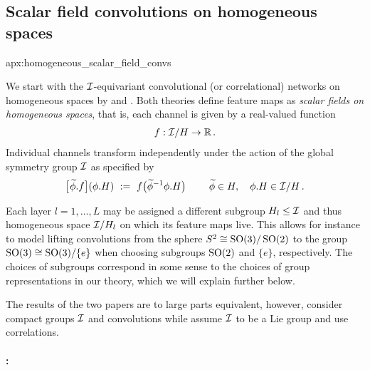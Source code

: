 \toclesslab\subsection{Scalar field convolutions on homogeneous spaces}{apx:homogeneous_scalar_field_convs}

We start with the $\mathcal{I}$-equivariant convolutional (or correlational) networks on homogeneous spaces by \citet{Kondor2018-GENERAL} and \citet{bekkers2020bspline}.
Both theories define feature maps as \emph{scalar fields on homogeneous spaces}, that is, each channel is given by a real-valued function
\begin{align}\label{eq:scalar_field_homogeneous_space}
    f: \mathcal{I}/H \to \mathbb{R} \,.
\end{align}
Individual channels transform independently under the action of the global symmetry group $\mathcal{I}$ as specified by
\begin{align}\label{eq:group_action_homogeneous_space_scalar_field}
    \big[\mkern1mu \widetilde{\phi}.f\big] (\phi.H)\ :=\ f\big( \widetilde{\phi}^{-1} \phi.H \big)
    \qquad\ \widetilde{\phi}\in H,\ \ \ \phi.H\in \mathcal{I}/H \,.
\end{align}

Each layer $l = 1,\dots, L$ may be assigned a different subgroup $H_l \leq\mathcal{I}$ and thus homogeneous space $\mathcal{I}/H_l$ on which its feature maps live.
This allows for instance to model lifting convolutions from the sphere $S^2 \cong \operatorname{SO}(3)/\operatorname{SO}(2)$ to the group $\operatorname{SO}(3) \cong \operatorname{SO}(3)/\{e\}$ when choosing subgroups $\operatorname{SO}(2)$ and $\{e\}$, respectively.
The choices of subgroups correspond in some sense to the choices of group representations in our theory, which we will explain further below.

The results of the two papers are to large parts equivalent, however,
\citet{Kondor2018-GENERAL} consider compact groups $\mathcal{I}$ and convolutions
while \citet{bekkers2020bspline} assume $\mathcal{I}$ to be a Lie group and use correlations.



\paragraph{\citet{Kondor2018-GENERAL} :}

